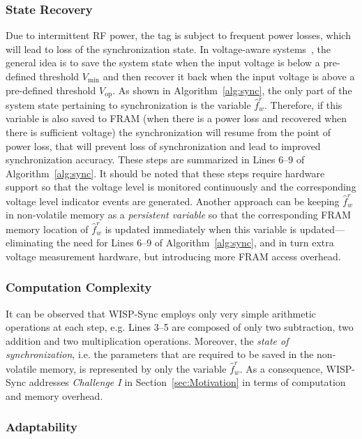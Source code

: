 \documentclass[10pt,journal,compsoc]{IEEEtran}
\begin{document}
\subsubsection{State Recovery}

Due to intermittent RF power, the tag is subject to frequent power losses, which will lead to loss of the synchronization state. In voltage-aware systems~\cite{Buettner:2011:Dewdrop,Ransford:2011:Mementos,Lucia:2015:Execution,Colin:2016:Debugger}, the general idea is to save the system state when the input voltage is below a pre-defined threshold $V_{\min}$ and then recover it back when the input voltage is above a pre-defined threshold $V_{\text{op}}$. As shown in Algorithm~\ref{alg:sync}, the only part of the system state pertaining to synchronization is the variable $\hat{f}_w^r$. Therefore, if this variable is also saved to FRAM (when there is a power loss and recovered when there is sufficient voltage) the synchronization will resume from the point of power loss, that will prevent loss of synchronization and lead to improved synchronization accuracy. These steps are summarized in Lines 6--9 of Algorithm~\ref{alg:sync}. It should be noted that these steps require hardware support so that the voltage level is monitored continuously and the corresponding voltage level indicator events are generated. Another approach can be keeping $\hat{f}_w^r$ in non-volatile memory as a \emph{persistent variable} so that the corresponding FRAM memory location of $\hat{f}_w^r$ is updated immediately when this variable is updated---eliminating the need for Lines 6--9 of Algorithm~\ref{alg:sync}, and in turn extra voltage measurement hardware, but introducing more FRAM access overhead.

\subsubsection{Computation Complexity\label{subsec:complexity}}

It can be observed that WISP-Sync employs only very simple arithmetic operations at each step, e.g. Lines 3--5 are composed of only two subtraction, two addition and two multiplication operations. Moreover, the \emph{state of synchronization}, i.e. the parameters that are required to be saved in the non-volatile memory, is represented by only the variable $\hat{f}_w^r$. As a consequence, WISP-Sync addresses \emph{Challenge I} in Section~\ref{sec:Motivation} in terms of computation and memory overhead. 

\subsubsection{Adaptability} 
\label{sec:adaptibility}
\end{document}
